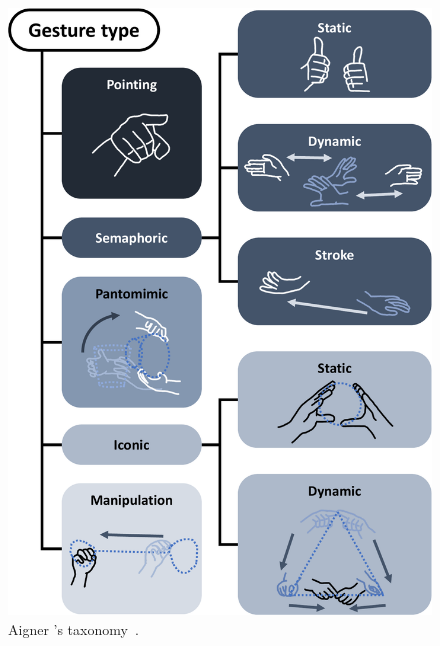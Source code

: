 

\begin{figure}[!b]
    \centering
    \includegraphics[width=.46\linewidth]{Figures/LUI/aigner.pdf}
    \caption{Aigner \etal's taxonomy~\cite{Aigner:2012}.}
    \label{fig:lui:aigner-classification}
\end{figure}

